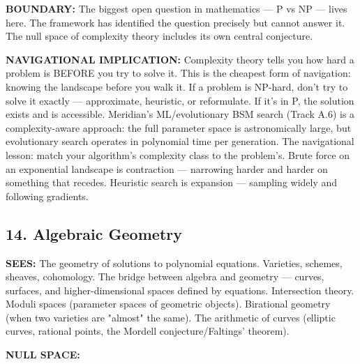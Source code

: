 \textbf{BOUNDARY:} The biggest open question in mathematics — P vs NP — lives here. The framework has identified the question precisely but cannot answer it. The null space of complexity theory includes its own central conjecture.


\textbf{NAVIGATIONAL IMPLICATION:} Complexity theory tells you how hard a problem is BEFORE you try to solve it. This is the cheapest form of navigation: knowing the landscape before you walk it. If a problem is NP-hard, don't try to solve it exactly — approximate, heuristic, or reformulate. If it's in P, the solution exists and is accessible. Meridian's ML/\allowbreak evolutionary BSM search (Track A.6) is a complexity-aware approach: the full parameter space is astronomically large, but evolutionary search operates in polynomial time per generation. The navigational lesson: match your algorithm's complexity class to the problem's. Brute force on an exponential landscape is contraction — narrowing harder and harder on something that recedes. Heuristic search is expansion — sampling widely and following gradients.


\bigskip\noindent\makebox[\textwidth]{\color{rulegray}\rule{5cm}{0.3pt}}\bigskip


\subsection*{14. Algebraic Geometry}


\textbf{SEES:} The geometry of solutions to polynomial equations. Varieties, schemes, sheaves, cohomology. The bridge between algebra and geometry — curves, surfaces, and higher-dimensional spaces defined by equations. Intersection theory. Moduli spaces (parameter spaces of geometric objects). Birational geometry (when two varieties are "almost" the same). The arithmetic of curves (elliptic curves, rational points, the Mordell conjecture/\allowbreak Faltings' theorem).


\textbf{NULL SPACE:}

